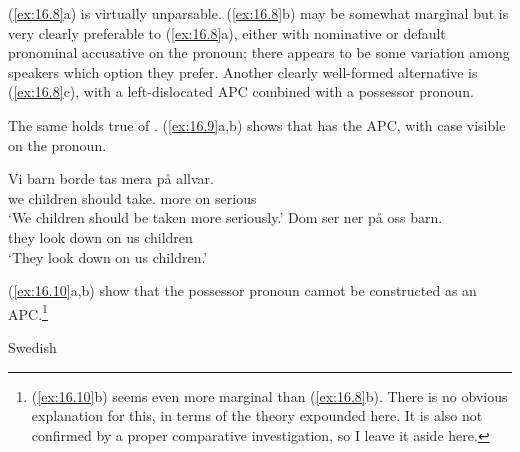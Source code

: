 \documentclass[output=paper]{langsci/langscibook}
\begin{document}
\ea\label{ex:16.8}
	\z
\z

(\ref{ex:16.8}a) is virtually unparsable. (\ref{ex:16.8}b) may be
somewhat marginal but is very clearly preferable to (\ref{ex:16.8}a),
either with nominative or default pronominal accusative on
the pronoun; there appears to be some variation among speakers which option
they prefer. Another clearly well-formed alternative is (\ref{ex:16.8}c),
with a left-dislocated \gls{APC} combined
with a possessor pronoun.

The same holds true of . (\ref{ex:16.9}a,b) shows that 
has the \gls{APC}, with
case visible on the pronoun.\largerpage[-2]

\ea\label{ex:16.9}
	\ea
		\gll Vi  barn  borde  tas  mera på allvar.\\
			we children should take.\Pass{} more on serious\\
		\glt    `We children should be taken more seriously.'
	\ex
		\gll Dom ser  ner  på oss barn.\\
			they  look down on us children\\
		\glt    `They look down on us children.'
	\z
\z

(\ref{ex:16.10}a,b) show that the possessor pronoun cannot be constructed as an
APC.\footnote{(\ref{ex:16.10}b) seems even more marginal than (\ref{ex:16.8}b). There is no obvious
explanation for this, in terms of the theory expounded here. It is also not
confirmed by a proper comparative investigation, so I leave it aside here.}

\ea Swedish\label{ex:16.10}
	\z
\z
\end{document}
